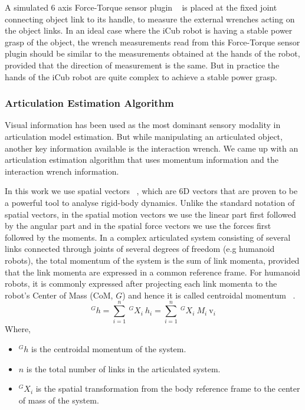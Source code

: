 \documentclass[12pt,a4paper]{report}
\begin{document}
A simulated 6 axis Force-Torque sensor plugin ~\cite{hoffman2014yarp} is placed at the fixed joint connecting object link to its handle, to measure the external wrenches acting on the object links. In an ideal case where the iCub robot is having a stable power grasp of the object, the wrench measurements read from this Force-Torque sensor plugin should be similar to the measurements obtained at the hands of the robot, provided that the direction of measurement is the same. But in practice the hands of the iCub robot are quite complex to achieve a stable power grasp.

\subsubsection*{Articulation Estimation Algorithm}

Visual information has been used as the most dominant sensory modality in articulation model estimation. But while manipulating an articulated object, another key information available is the interaction wrench. We came up with an articulation estimation algorithm that uses momentum information and the interaction wrench information.

In this work we use spatial vectors ~\cite{featherstone2014rigid}, which are 6D vectors that are proven to be a powerful tool to analyse rigid-body dynamics. Unlike the standard notation of spatial vectors, in the spatial motion vectors we use the linear part first followed by the angular part and in the spatial force vectors we use the forces first followed by the moments. In a complex articulated system consisting of several links connected through joints of several degrees of freedom (e.g humanoid robots), the total momentum of the system is the sum of link momenta, provided that the link momenta are expressed in a common reference frame. For humanoid robots, it is commonly expressed after projecting each link momenta to the robot's Center of Mass (CoM, $G$) and hence it is called centroidal momentum ~\cite{orin2013centroidal}. 
\begin{equation}
  ^Gh=\sum\limits_{i=1}^n \ ^GX_i \ h_i = \sum\limits_{i=1}^n \ ^GX_i \ M_i \ \mathrm{v}_i
\end{equation}
Where, 
\begin{itemize}
  \item $^Gh$ is the centroidal momentum of the system.
  \item  $n$ is the total number of links in the articulated system.
  \item $^GX_i$ is the spatial transformation from the body reference frame to the center of mass of the system. 
\end{itemize}
\end{document}
